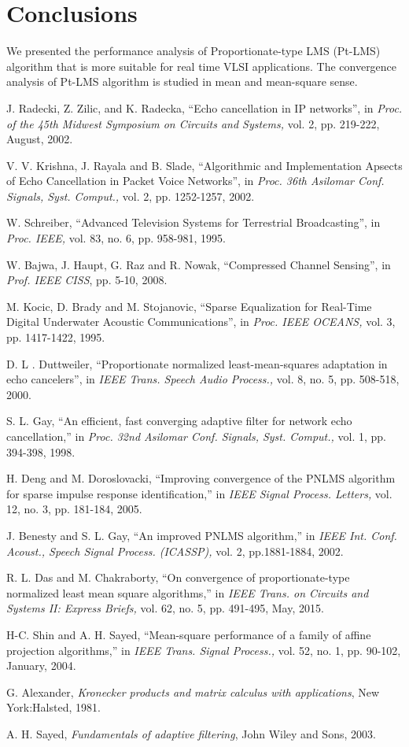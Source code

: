 \documentclass[journal, one column]{IEEEtran}
\begin{document}
\section{Conclusions}
We presented the performance analysis of Proportionate-type LMS (Pt-LMS) algorithm that is more suitable for real time VLSI applications. The convergence analysis of Pt-LMS algorithm is studied in mean and mean-square sense.
\begin{thebibliography}{1}
J. Radecki, Z. Zilic, and K. Radecka, ``Echo cancellation in IP networks'',
in \emph{Proc. of the 45th Midwest Symposium on Circuits and Systems,} vol. 2, pp. 219-222, August, 2002.

V. V. Krishna, J. Rayala and B. Slade, ``Algorithmic and Implementation
Apsects of Echo Cancellation in Packet Voice Networks'',
in \emph{Proc. 36th Asilomar Conf. Signals, Syst. Comput.,} vol. 2, pp. 1252-1257, 2002.

W. Schreiber, ``Advanced Television Systems for Terrestrial Broadcasting'',
in \emph{Proc. IEEE,} vol. 83, no. 6, pp. 958-981, 1995.

W. Bajwa, J. Haupt, G. Raz and R. Nowak, ``Compressed Channel
Sensing'', in \emph{Prof. IEEE CISS}, pp. 5-10, 2008.

M. Kocic, D. Brady and M. Stojanovic, ``Sparse Equalization for
Real-Time Digital Underwater Acoustic Communications'',
in \emph{Proc. IEEE OCEANS,} vol. 3, pp. 1417-1422, 1995.

D. L . Duttweiler, ``Proportionate normalized least-mean-squares adaptation in echo cancelers'',
in \emph{IEEE Trans. Speech Audio Process.,} vol. 8, no. 5, pp. 508-518, 2000.

S. L. Gay, ``An efficient, fast converging adaptive filter for network echo cancellation,''
in \emph{Proc. 32nd Asilomar Conf. Signals, Syst. Comput.,} vol. 1, pp. 394-398, 1998.

H. Deng and M. Doroslovacki, ``Improving convergence of the PNLMS algorithm for sparse impulse response identification,''
in \emph{IEEE Signal Process. Letters,} vol. 12, no. 3, pp. 181-184, 2005.

J. Benesty and S. L. Gay, ``An improved PNLMS algorithm,''
in \emph{IEEE Int. Conf. Acoust., Speech Signal Process. (ICASSP),} vol. 2, pp.1881-1884, 2002.

R. L. Das and M. Chakraborty, ``On convergence of proportionate-type normalized least mean square algorithms,''
in \emph{IEEE Trans. on Circuits and Systems II: Express Briefs,} vol. 62, no. 5, pp. 491-495, May, 2015.

H-C. Shin and A. H. Sayed, ``Mean-square performance of a family of affine projection algorithms,''
in \emph{IEEE Trans. Signal Process.,} vol. 52, no. 1, pp. 90-102, January, 2004.

G. Alexander, \emph{Kronecker products and matrix calculus with applications}, New York:Halsted, 1981.

A. H. Sayed, \emph{Fundamentals of adaptive filtering}, John Wiley and Sons, 2003.

\end{thebibliography}
\end{document}
